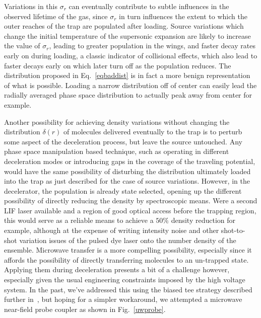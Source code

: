 Variations in this $\sigma_r$ can eventually contribute to subtle influences in the observed lifetime of the gas, since $\sigma_r$ in turn influences the extent to which the outer reaches of the trap are populated after loading.
Source variations which change the initial temperature of the supersonic expansion are likely to increase the value of $\sigma_r$, leading to greater population in the wings, and faster decay rates early on during loading, a classic indicator of collisional effects, which also lead to faster decays early on which later turn off as the population reduces.
The distribution proposed in Eq.~\ref{eqbaddist} is in fact a more benign representation of what is possible.
Loading a narrow distribution off of center can easily lead the radially averaged phase space distribution to actually peak away from center for example.


Another possibility for achieving density variations without changing the distribution $\delta(r)$ of molecules delivered eventually to the trap is to perturb some aspect of the deceleration process, but leave the source untouched.
Any phase space manipulation based technique, such as operating in different deceleration modes or introducing gaps in the coverage of the traveling potential, would have the same possibility of disturbing the distribution ultimately loaded into the trap as just described for the case of source variations.
However, in the decelerator, the population is already state selected, opening up the different possibility of directly reducing the density by spectroscopic means.
Were a second LIF laser available and a region of good optical access before the trapping region, this would serve as a reliable means to achieve a $50\%$ density reduction for example, although at the expense of writing intensity noise and other shot-to-shot variation issues of the pulsed dye laser onto the number density of the ensemble.
Microwave transfer is a more compelling possibility, especially since it affords the possibility of directly transferring molecules to an un-trapped state.
Applying them during deceleration presents a bit of a challenge however, especially given the usual engineering constraints imposed by the high voltage system.
In the past, we've addressed this using the biased tee strategy described further in~\cite{Stuhl2012uwave}, but hoping for a simpler workaround, we attempted a microwave near-field probe coupler as shown in Fig.~\ref{uwprobe}.

